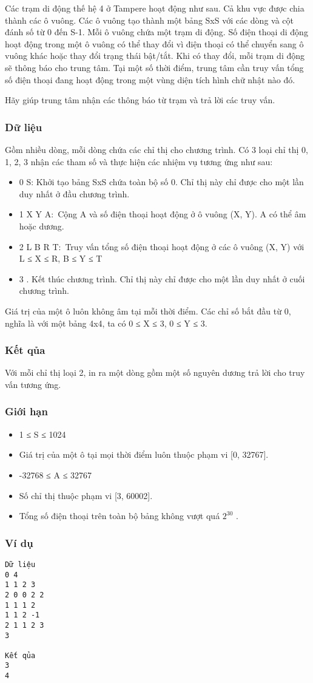

Các trạm di động thế hệ 4 ở Tampere hoạt động như sau. Cả khu vực được chia thành các ô vuông. Các ô vuông tạo thành một bảng SxS với các dòng và cột đánh số từ 0 đến S-1. Mỗi ô vuông chứa một trạm di động. Số điện thoại di động hoạt động trong một ô vuông có thể thay đổi vì điện thoại có thể chuyển sang ô vuông khác hoặc thay đổi trạng thái bật/tắt. Khi có thay đổi, mỗi trạm di động sẽ thông báo cho trung tâm. Tại một số thời điểm, trung tâm cần truy vấn tổng số điện thoại đang hoạt động trong một vùng diện tích hình chữ nhật nào đó.

Hãy giúp trung tâm nhận các thông báo từ trạm và trả lời các truy vấn.

\subsubsection{Dữ liệu}

Gồm nhiều dòng, mỗi dòng chứa các chỉ thị cho chương trình. Có 3 loại chỉ thị 0, 1, 2, 3 nhận các tham số và thực hiện các nhiệm vụ tương ứng như sau:
\begin{itemize}
	\item 0 S: Khởi tạo bảng SxS chứa toàn bộ số 0. Chỉ thị này chỉ được cho một lần duy nhất ở đầu chương trình.
	\item 1 X Y A: Cộng A và số điện thoại hoạt động ở ô vuông (X, Y). A có thể âm hoặc dương.
	\item 2 L B R T: Truy vấn tổng số điện thoại hoạt động ở các ô vuông (X, Y) với L ≤ X ≤ R, B ≤ Y ≤ T
	\item 3 . Kết thúc chương trình. Chỉ thị này chỉ được cho một lần duy nhất ở cuối chương trình.
\end{itemize}

Giá trị của một ô luôn không âm tại mỗi thời điểm. Các chỉ số bắt đầu từ 0, nghĩa là với một bảng 4x4, ta có 0 ≤ X ≤ 3, 0 ≤ Y ≤ 3.

\subsubsection{Kết qủa}

Với mỗi chỉ thị loại 2, in ra một dòng gồm một số nguyên dương trả lời cho truy vấn tương ứng.

\subsubsection{Giới hạn}
\begin{itemize}
	\item 1 ≤ S ≤ 1024
	\item Giá trị của một ô tại mọi thời điểm luôn thuộc phạm vi [0, 32767].
	\item -32768 ≤ A ≤ 32767
	\item Số chỉ thị thuộc phạm vi [3, 60002].
	\item Tổng số điện thoại trên toàn bộ bảng không vượt quá $2^{30}$ .
\end{itemize}

\subsubsection{Ví dụ}
\begin{verbatim}
Dữ liệu
0 4  		
1 1 2 3  		
2 0 0 2 2
1 1 1 2
1 1 2 -1
2 1 1 2 3
3

Kết qủa
3
4
\end{verbatim}
